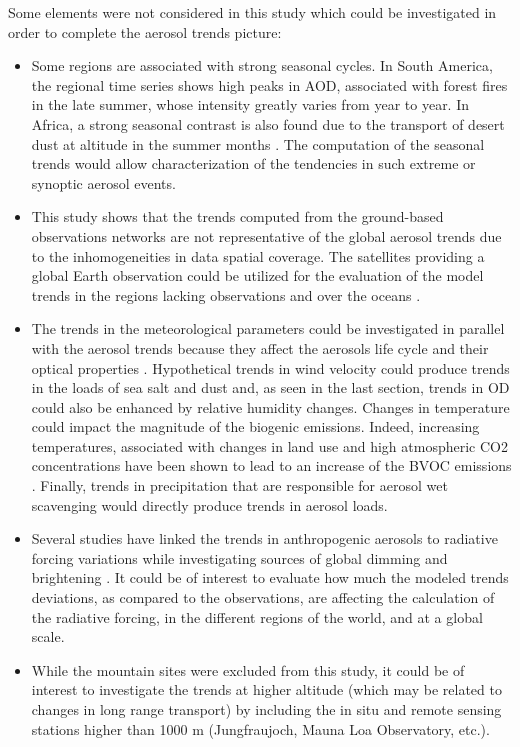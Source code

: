 \documentclass[acp, manuscript]{copernicus}
\begin{document}
Some elements were not considered in this study which could be investigated in order to complete the aerosol trends picture:
\begin{itemize}
 \item Some regions are associated with strong seasonal cycles. In South America, the regional time series shows high peaks in AOD, associated with forest fires in the late summer, whose intensity greatly varies from year to year. In Africa, a strong seasonal contrast is also found due to the transport of desert dust at altitude in the summer months \citep{mortier2016, ogunjobi2008synoptic}. The computation of the seasonal trends would allow characterization of the tendencies in such extreme or synoptic aerosol events.
 \item  This study shows that the trends computed from the ground-based observations networks are not representative of the global aerosol trends due to the inhomogeneities in data spatial coverage. The satellites providing a global Earth observation could be utilized for the evaluation of the model trends in the regions lacking observations and over the oceans \citep{hsu2012global,zhang2010decadal}.
 \item The trends in the meteorological parameters could be investigated in parallel with the aerosol trends because they affect the aerosols life cycle and their optical properties \citep{che2019large}. Hypothetical trends in wind velocity could produce trends in the loads of sea salt and dust and, as seen in the last section, trends in OD could also be enhanced by relative humidity changes. Changes in temperature could impact the magnitude of the biogenic emissions. Indeed, increasing temperatures, associated with changes in land use and high atmospheric CO2 concentrations have been shown to lead to an increase of the BVOC emissions \citep{penuelas2010bvocs}. Finally, trends in precipitation that are responsible for aerosol wet scavenging would directly produce trends in aerosol loads.
 \item Several studies have linked the trends in anthropogenic aerosols to radiative forcing variations while investigating sources of global dimming and brightening \citep{streets2006two,norris2007trends}. It could be of interest to evaluate how much the modeled trends deviations, as compared to the observations, are affecting the calculation of the radiative forcing, in the different regions of the world, and at a global scale.
 \item While the mountain sites were excluded from this study, it could be of interest to investigate the trends at higher altitude (which may be related to changes in long range transport) by including the in situ and remote sensing stations higher than 1000 m (Jungfraujoch, Mauna Loa Observatory, etc.).

\end{itemize}
\end{document}
